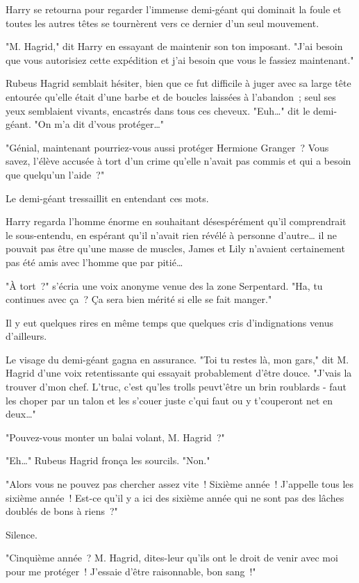 Harry se retourna pour regarder l'immense demi-géant qui dominait la foule et toutes les autres têtes se tournèrent vers ce dernier d'un seul mouvement.

"M. Hagrid," dit Harry en essayant de maintenir son ton imposant. "J'ai besoin que vous autorisiez cette expédition et j'ai besoin que vous le fassiez maintenant."

Rubeus Hagrid semblait hésiter, bien que ce fut difficile à juger avec sa large tête entourée qu'elle était d'une barbe et de boucles laissées à l'abandon~; seul ses yeux semblaient vivants, encastrés dans tous ces cheveux. "Euh…" dit le demi-géant. "On m'a dit d'vous protéger…"

"Génial, maintenant pourriez-vous aussi protéger Hermione Granger~? Vous savez, l'élève accusée à tort d'un crime qu'elle n'avait pas commis et qui a besoin que quelqu'un l'aide~?"

Le demi-géant tressaillit en entendant ces mots.

Harry regarda l'homme énorme en souhaitant désespérément qu'il comprendrait le sous-entendu, en espérant qu'il n'avait rien révélé à personne d'autre… il ne pouvait pas être qu'une masse de muscles, James et Lily n'avaient certainement pas été amis avec l'homme que par pitié…

"À tort~?" s'écria une voix anonyme venue des la zone Serpentard. "Ha, tu continues avec ça~? Ça sera bien mérité si elle se fait manger."

Il y eut quelques rires en même temps que quelques cris d'indignations venus d'ailleurs.

Le visage du demi-géant gagna en assurance. "Toi tu restes là, mon gars," dit M. Hagrid d'une voix retentissante qui essayait probablement d'être douce. "J'vais la trouver d'mon chef. L'truc, c'est qu'les trolls peuvt'être un brin roublards - faut les choper par un talon et les s'couer juste c'qui faut ou y t'couperont net en deux…"

"Pouvez-vous monter un balai volant, M. Hagrid~?"

"Eh…" Rubeus Hagrid fronça les sourcils. "Non."

"Alors vous ne pouvez pas chercher assez vite~! Sixième année~! J'appelle tous les sixième année~! Est-ce qu'il y a ici des sixième année qui ne sont pas des lâches doublés de bons à riens~?"

Silence.

"Cinquième année~? M. Hagrid, dites-leur qu'ils ont le droit de venir avec moi pour me protéger~! J'essaie d'être raisonnable, bon sang~!"

